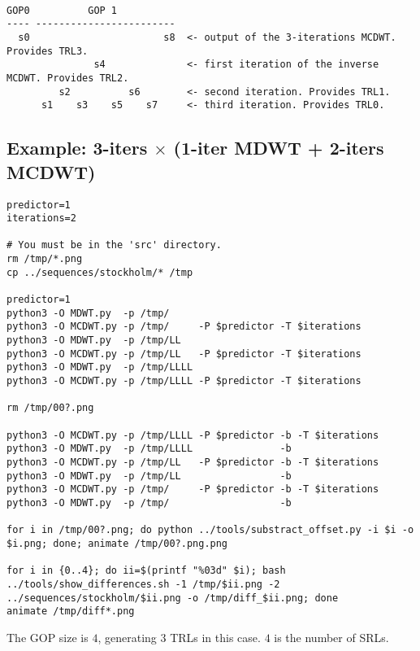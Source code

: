 \begin{verbatim}

GOP0          GOP 1
---- ------------------------
  s0                       s8  <- output of the 3-iterations MCDWT. Provides TRL3.
               s4              <- first iteration of the inverse MCDWT. Provides TRL2.
         s2          s6        <- second iteration. Provides TRL1.
      s1    s3    s5    s7     <- third iteration. Provides TRL0.

\end{verbatim}

\subsection*{Example: 3-iters $\times$ (1-iter MDWT + 2-iters MCDWT)}

\begin{verbatim}
predictor=1
iterations=2

# You must be in the 'src' directory.
rm /tmp/*.png
cp ../sequences/stockholm/* /tmp

predictor=1
python3 -O MDWT.py  -p /tmp/
python3 -O MCDWT.py -p /tmp/     -P $predictor -T $iterations
python3 -O MDWT.py  -p /tmp/LL
python3 -O MCDWT.py -p /tmp/LL   -P $predictor -T $iterations
python3 -O MDWT.py  -p /tmp/LLLL
python3 -O MCDWT.py -p /tmp/LLLL -P $predictor -T $iterations

rm /tmp/00?.png

python3 -O MCDWT.py -p /tmp/LLLL -P $predictor -b -T $iterations
python3 -O MDWT.py  -p /tmp/LLLL               -b
python3 -O MCDWT.py -p /tmp/LL   -P $predictor -b -T $iterations
python3 -O MDWT.py  -p /tmp/LL                 -b
python3 -O MCDWT.py -p /tmp/     -P $predictor -b -T $iterations
python3 -O MDWT.py  -p /tmp/                   -b

for i in /tmp/00?.png; do python ../tools/substract_offset.py -i $i -o $i.png; done; animate /tmp/00?.png.png

for i in {0..4}; do ii=$(printf "%03d" $i); bash ../tools/show_differences.sh -1 /tmp/$ii.png -2 ../sequences/stockholm/$ii.png -o /tmp/diff_$ii.png; done
animate /tmp/diff*.png
\end{verbatim}

The GOP size is $4$, generating $3$ TRLs in this case. $4$ is the number of
SRLs.

